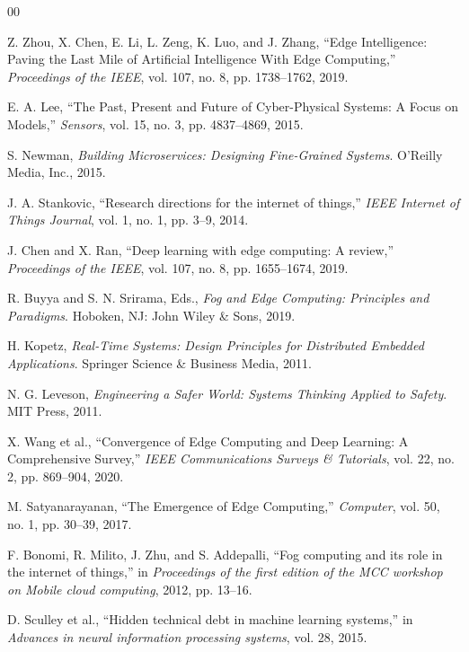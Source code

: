 \documentclass[conference]{IEEEtran}
\begin{document}
\begin{thebibliography}{00}

 Z. Zhou, X. Chen, E. Li, L. Zeng, K. Luo, and J. Zhang, ``Edge Intelligence: Paving the Last Mile of Artificial Intelligence With Edge Computing,'' \textit{Proceedings of the IEEE}, vol. 107, no. 8, pp. 1738--1762, 2019.

 E. A. Lee, ``The Past, Present and Future of Cyber-Physical Systems: A Focus on Models,'' \textit{Sensors}, vol. 15, no. 3, pp. 4837--4869, 2015.

 S. Newman, \textit{Building Microservices: Designing Fine-Grained Systems}. O'Reilly Media, Inc., 2015.

 J. A. Stankovic, ``Research directions for the internet of things,'' \textit{IEEE Internet of Things Journal}, vol. 1, no. 1, pp. 3--9, 2014.

 J. Chen and X. Ran, ``Deep learning with edge computing: A review,'' \textit{Proceedings of the IEEE}, vol. 107, no. 8, pp. 1655--1674, 2019.

 R. Buyya and S. N. Srirama, Eds., \textit{Fog and Edge Computing: Principles and Paradigms}. Hoboken, NJ: John Wiley \& Sons, 2019.

 H. Kopetz, \textit{Real-Time Systems: Design Principles for Distributed Embedded Applications}. Springer Science \& Business Media, 2011.

 N. G. Leveson, \textit{Engineering a Safer World: Systems Thinking Applied to Safety}. MIT Press, 2011.

 X. Wang et al., ``Convergence of Edge Computing and Deep Learning: A Comprehensive Survey,'' \textit{IEEE Communications Surveys \& Tutorials}, vol. 22, no. 2, pp. 869--904, 2020.

 M. Satyanarayanan, ``The Emergence of Edge Computing,'' \textit{Computer}, vol. 50, no. 1, pp. 30--39, 2017.

 F. Bonomi, R. Milito, J. Zhu, and S. Addepalli, ``Fog computing and its role in the internet of things,'' in \textit{Proceedings of the first edition of the MCC workshop on Mobile cloud computing}, 2012, pp. 13--16.

 D. Sculley et al., ``Hidden technical debt in machine learning systems,'' in \textit{Advances in neural information processing systems}, vol. 28, 2015.


\end{thebibliography}
\end{document}
